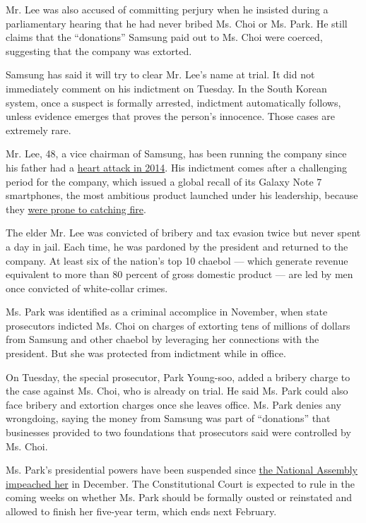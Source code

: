 Mr. Lee was also accused of committing perjury when he insisted during a
parliamentary hearing that he had never bribed Ms. Choi or Ms. Park. He
still claims that the ``donations'' Samsung paid out to Ms. Choi were
coerced, suggesting that the company was extorted.

Samsung has said it will try to clear Mr. Lee's name at trial. It did
not immediately comment on his indictment on Tuesday. In the South
Korean system, once a suspect is formally arrested, indictment
automatically follows, unless evidence emerges that proves the person's
innocence. Those cases are extremely rare.

Mr. Lee, 48, a vice chairman of Samsung, has been running the company
since his father had a
\href{https://www.nytimes.com/2014/05/12/business/international/samsungs-chairman-has-surgery-after-heart-attack.html}{heart
attack in 2014}. His indictment comes after a challenging period for the
company, which issued a global recall of its Galaxy Note 7 smartphones,
the most ambitious product launched under his leadership, because they
\href{https://www.nytimes.com/2016/09/03/business/samsung-galaxy-note-battery.html}{were
prone to catching fire}.

The elder Mr. Lee was convicted of bribery and tax evasion twice but
never spent a day in jail. Each time, he was pardoned by the president
and returned to the company. At least six of the nation's top 10 chaebol
--- which generate revenue equivalent to more than 80 percent of gross
domestic product --- are led by men once convicted of white-collar
crimes.

Ms. Park was identified as a criminal accomplice in November, when state
prosecutors indicted Ms. Choi on charges of extorting tens of millions
of dollars from Samsung and other chaebol by leveraging her connections
with the president. But she was protected from indictment while in
office.

On Tuesday, the special prosecutor, Park Young-soo, added a bribery
charge to the case against Ms. Choi, who is already on trial. He said
Ms. Park could also face bribery and extortion charges once she leaves
office. Ms. Park denies any wrongdoing, saying the money from Samsung
was part of ``donations'' that businesses provided to two foundations
that prosecutors said were controlled by Ms. Choi.

Ms. Park's presidential powers have been suspended since
\href{https://www.nytimes.com/2016/12/09/world/asia/south-korea-president-park-geun-hye-impeached.html}{the
National Assembly impeached her} in December. The Constitutional Court
is expected to rule in the coming weeks on whether Ms. Park should be
formally ousted or reinstated and allowed to finish her five-year term,
which ends next February.

